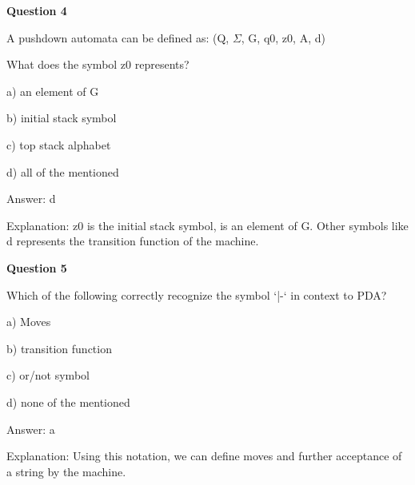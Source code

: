 \documentclass{article}
\begin{document}
\begin{mdframed}[linewidth=1pt, roundcorner=5pt, linecolor=gray!30, backgroundcolor=gray!5]
\textbf{Question 4} 

A pushdown automata can be defined as: (Q, $\Sigma$, G, q0, z0, A, d)

What does the symbol z0 represents?

a) an element of G

b) initial stack symbol

c) top stack alphabet

d) all of the mentioned
\vspace{5pt} \par
\begin{tcolorbox}[colback=green!5, colframe=green!40!black, title=Solution]
Answer: d

Explanation: z0 is the initial stack symbol, is an element of G. Other symbols like d represents the transition function of the machine.
\end{tcolorbox}
\end{mdframed}

\begin{mdframed}[linewidth=1pt, roundcorner=5pt, linecolor=gray!30, backgroundcolor=gray!5]
\textbf{Question 5} 

Which of the following correctly recognize the symbol ‘|-‘ in context to PDA?

a) Moves

b) transition function

c) or/not symbol

d) none of the mentioned
\vspace{5pt} \par
\begin{tcolorbox}[colback=green!5, colframe=green!40!black, title=Solution]
Answer: a

Explanation: Using this notation, we can define moves and further acceptance of a string by the machine.
\end{tcolorbox}
\end{mdframed}
\end{document}
